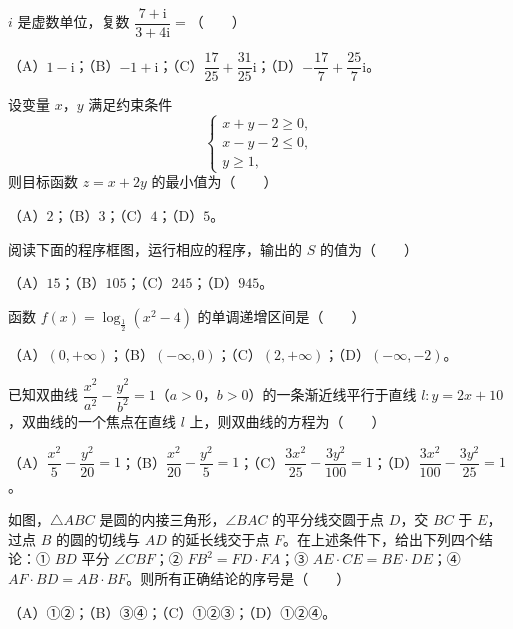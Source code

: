 \begin{question}
$i$ 是虚数单位，复数 $\dfrac{7+\mathrm i}{3+4\mathrm i}=$\mbox{（　　）}

（A）$1-\mathrm i$；（B）$-1+\mathrm i$；（C）$\dfrac{17}{25}+\dfrac{31}{25}\mathrm i$；（D）$-\dfrac{17}{7}+\dfrac{25}{7}\mathrm i$。

\end{question}
\begin{question}
设变量 $x$，$y$ 满足约束条件
\nopagebreak[4]
\[\begin{cases}
x+y-2\geqslant 0,\\
x-y-2\leqslant 0,\\
y\geqslant 1,
\end{cases}\]
则目标函数 $z=x+2y$ 的最小值为\mbox{（　　）}

（A）$2$；（B）$3$；（C）$4$；（D）$5$。

\Needspace{0.4\textheight}
\end{question}
\begin{question}
阅读下面的程序框图，运行相应的程序，输出的 $S$ 的值为\mbox{（　　）}
\nopagebreak[4]
\begin{center}\end{center}
\nopagebreak[4]
（A）$15$；（B）$105$；（C）$245$；（D）$945$。

\end{question}
\begin{question}
函数 $f(x)=\log_{\frac12}(x^2-4)$ 的单调递增区间是\mbox{（　　）}

（A）$(0,+\infty)$；（B）$(-\infty,0)$；（C）$(2,+\infty)$；（D）$(-\infty,-2)$。

\end{question}
\begin{question}
已知双曲线 $\dfrac{x^2}{a^2}-\dfrac{y^2}{b^2}=1$（$a>0$，$b>0$）的一条渐近线平行于直线 $l:y=2x+10$，双曲线的一个焦点在直线 $l$ 上，则双曲线的方程为\mbox{（　　）}

（A）$\dfrac{x^2}{5}-\dfrac{y^2}{20}=1$；（B）$\dfrac{x^2}{20}-\dfrac{y^2}{5}=1$；（C）$\dfrac{3x^2}{25}-\dfrac{3y^2}{100}=1$；（D）$\dfrac{3x^2}{100}-\dfrac{3y^2}{25}=1$。

\Needspace{0.4\textheight}
\end{question}
\begin{question}
如图，$\triangle ABC$ 是圆的内接三角形，$\angle BAC$ 的平分线交圆于点 $D$，交 $BC$ 于 $E$，过点 $B$ 的圆的切线与 $AD$ 的延长线交于点 $F$。在上述条件下，给出下列四个结论：① $BD$ 平分 $\angle CBF$；② $FB^2=FD\cdot FA$；③ $AE\cdot CE=BE\cdot DE$；④ $AF\cdot BD=AB\cdot BF$。则所有正确结论的序号是\mbox{（　　）}
\nopagebreak[4]
\begin{center}\end{center}
\nopagebreak[4]
（A）①②；（B）③④；（C）①②③；（D）①②④。

\end{question}
